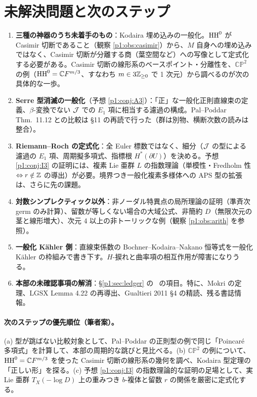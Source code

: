 \section{未解決問題と次のステップ}\label{p1:sec:open}
\begin{enumerate}
\item \textbf{三種の神器のうち未着手のもの}：Kodaira 埋め込みの一般化。$\mathrm{HH}^0$ が Casimir 切断であること（観察 \ref{p1:obs:casimir}）から、$M$ 自身への埋め込みではなく、Casimir 切断が分離する商（葉空間など）への写像として定式化する必要がある。Casimir 切断の線形系のベースポイント・分離性を、$\mathbb{CP}^2$ の例（$\mathrm{HH}^0=\mathbb C F^{m/3}$、すなわち $m\in3\mathbb Z_{\ge0}$ で 1 次元）から調べるのが次の具体的な一歩。
\item \textbf{Serre 型消滅の一般化}（予想 \ref{p1:conj:A3}）：「正」な一般化正則直線束の定義、$\beta$-変換でない $\mathcal J$ での $E_1$ 項に相当する濾過の構成。Pal--Poddar Thm.\ 11.12 との比較は \S11 の再読で行った（群は別物、横断次数の読みは整合）。
\item \textbf{Riemann--Roch の定式化}：全 Euler 標数ではなく、細分（$\mathcal J$ の型による濾過の $E_1$ 項、周期擬多項式、指標根 $H^*(\partial U)$）を決める。予想 \ref{p1:conj:I3} の証明には、複素 Lie 亜群 $L$ の指数理論（単模性・Fredholm 性 $\Leftrightarrow r\notin\mathbb Z$ の導出）が必要。境界つき一般化複素多様体への APS 型の拡張は、さらに先の課題。
\item \textbf{対数シンプレクティック以外}：非ノーダル特異点の局所理論の証明（準斉次 germ のみ計算）、留数が等しくない場合の大域公式、非簡約 $D$（無限次元の茎と線形増大）、次元 4 以上の非トーリックな例（観察 \ref{p1:obs:arith} を参照）。
\item \textbf{一般化 Kähler 側}：直線束係数の Bochner--Kodaira--Nakano 恒等式を一般化 Kähler の枠組みで書き下す。$H$-捩れと曲率項の相互作用が障害になりうる\tK。
\item \textbf{本部の未確認事項の解消}：\S\ref{p1:sec:ledger} の \tQ\ の項目。特に、Mokri の定理、LGSX Lemma 4.22 の再導出、Gualtieri 2011 \S4 の精読、残る書誌情報。
\end{enumerate}

\paragraph{次のステップの優先順位（筆者案）。}
(a) 型が跳ばない比較対象として、Pal--Poddar の正則型の例で同じ「Poincaré 多項式」を計算して、本部の周期的な跳びと見比べる。(b) $\mathbb{CP}^2$ の例について、$\mathrm{HH}^0=\mathbb C F^{m/3}$ を使った Casimir 切断の線形系の幾何を調べ、Kodaira 型定理の「正しい形」を探る。(c) 予想 \ref{p1:conj:I3} の指数理論的な証明の足場として、実 Lie 亜群 $T_X(-\log D)$ 上の重みつき $b$-複体と留数 $r$ の関係を厳密に定式化する。
